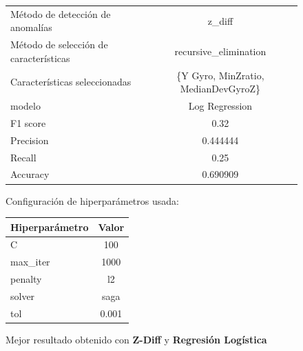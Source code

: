 \begin{appendices}
		\begin{figure}[htb]
			\centering
			\caption{Mejor resultado obtenido con \textbf{Z-Diff} y \textbf{Regresión Logística}}
			\label{table:30}
			\begin{tabular}{lc}
				\toprule
				\midrule
					  Método de detección de anomalías &                              z\_diff \\
				Método de selección de características &               recursive\_elimination \\
						 Características seleccionadas & \{Y Gyro, MinZratio, MedianDevGyroZ\} \\
												modelo &                      Log Regression \\
											  F1 score &                                0.32 \\
											 Precision &                            0.444444 \\
												Recall &                                0.25 \\
											  Accuracy &                            0.690909 \\
				\bottomrule
				\end{tabular}
			\newline
			\newline
			Configuración de hiperparámetros usada:
			\begin{tabular}{lc}
				\toprule
				Hiperparámetro &  Valor \\
				\midrule
							 C &    100 \\
					  max\_iter &   1000 \\
					   penalty &     l2 \\
						solver &   saga \\
						   tol &  0.001 \\
				\bottomrule
			\end{tabular}
			
		\end{figure}


\end{appendices}
